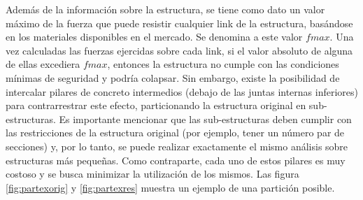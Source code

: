 Adem\'as de la informaci\'on sobre la estructura, se tiene como dato un valor m\'aximo de la fuerza que puede resistir cualquier
link de la estructura, bas\'andose en los materiales disponibles en el mercado. Se denomina a este valor $fmax$. Una vez
calculadas las fuerzas ejercidas sobre cada link, si el valor absoluto de alguna de ellas excediera $fmax$, entonces la
estructura no cumple con las condiciones m\'inimas de seguridad y podr\'ia colapsar. Sin embargo, existe la posibilidad
de intercalar pilares de concreto intermedios (debajo de las juntas internas inferiores) para contrarrestrar este
efecto, particionando la estructura original en sub-estructuras. Es importante mencionar que las sub-estructuras deben
cumplir con las restricciones de la estructura original (por ejemplo, tener un n\'umero par de secciones) y, por lo
tanto, se puede realizar exactamente el mismo an\'alisis sobre estructuras m\'as peque\~nas. 
Como contraparte, cada uno de estos pilares es muy costoso y se busca minimizar la utilizaci\'on de los mismos. Las
figura \ref{fig:partexorig} y \ref{fig:partexres} muestra un ejemplo de una partici\'on posible.

